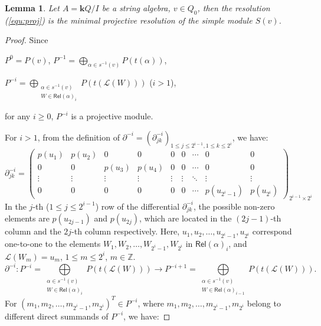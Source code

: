 \documentclass[11pt]{amsart}
\numberwithin{equation}{section}
\newtheorem{lemma}[theorem]{Lemma}
\theoremstyle{definition}
\begin{document}
\begin{lemma}\label{lem:proj-formula}
	Let \( A = \mathbf{k}Q/I \) be a string algebra, \( v \in Q_0 \), then the resolution (\ref{equ:proj}) is the minimal projective resolution of the simple module \( S(v) \).
\end{lemma}
\begin{proof}
	Since 
	\begin{center}
		\( P^0 = P(v) \), \( P^{-1} = \bigoplus\limits_{\alpha \in s^{-1}(v)} P(t(\alpha)) \), 
		
		\( P^{-i} = \bigoplus\limits_{\substack{\alpha \in s^{-1}(v) \\ W \in \mathsf{Rel}(\alpha)_i}} P(t(\mathscr{L}(W))) \) (\( i > 1 \)),
	\end{center}
	 for any \( i \geq 0 \), \( P^{-i} \) is a projective module.
	
	For \( i > 1 \), from the definition of \( \partial^{-i} = (\partial^{-i}_{jk})_{1 \leq j \leq 2^{i- 1 }, 1 \leq k \leq 2^i} \), we have:
	\[
	\partial^{-i}_{jk} = \begin{pmatrix}
		p(u_1) & p(u_2) & 0 & 0 & 0 & 0 & \cdots & 0 & 0 \\
		0 & 0 & p(u_3) & p(u_4) & 0 & 0 & \cdots & 0 & 0 \\
		\vdots & \vdots & \vdots & \vdots & \vdots & \vdots & \ddots & \vdots & \vdots \\
		0 & 0 & 0 & 0 & 0 & 0 & \cdots & p(u_{2^i - 1}) & p(u_{2^i})
	\end{pmatrix}_{2^{i- 1 } \times 2^i}
	\]
	In the \( j \)-th (\( 1 \leq j \leq 2^{i- 1 } \)) row of the differential \( \partial^{-i}_{jk} \), the possible non-zero elements are \( p(u_{2j - 1}) \) and \( p(u_{2j}) \), which are located in the \( (2j - 1) \)-th column and the \( 2j \)-th column respectively. Here, \( u_1, u_2, \ldots, u_{2^i - 1}, u_{2^i} \) correspond one-to-one to the elements \( W_1, W_2, \ldots, W_{2^i - 1}, W_{2^i} \) in \( \mathsf{Rel}(\alpha)_i \), and \( \mathscr{L}(W_m) = u_m \), \( 1 \leq m \leq 2^i \), \( m \in \mathbb{Z} \).
	\[
	\partial^{-i}: P^{-i} = \bigoplus\limits_{\substack{\alpha \in s^{-1}(v) \\ W \in \mathsf{Rel}(\alpha)_i}} P(t(\mathscr{L}(W))) \longrightarrow P^{-i + 1} = \bigoplus\limits_{\substack{\alpha \in s^{-1}(v) \\ W \in \mathsf{Rel}(\alpha)_{i - 1}}} P(t(\mathscr{L}(W))).
	\]
	For \( (m_1, m_2, \ldots, m_{2^i - 1}, m_{2^i})^T \in P^{-i} \), where \( m_1, m_2, \ldots, m_{2^i - 1}, m_{2^i} \) belong to different direct summands of \( P^{-i} \), we have:
	

\end{proof}
\end{document}
